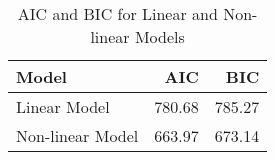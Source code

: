 \begin{table}[ht]
\centering
\begin{tabular}{lrr}
  \hline
Model & AIC & BIC \\ 
  \hline
Linear Model & 780.68 & 785.27 \\ 
  Non-linear Model & 663.97 & 673.14 \\ 
   \hline
\end{tabular}
\caption{AIC and BIC for Linear and Non-linear Models} 
\label{tab:aic_bic}
\end{table}
